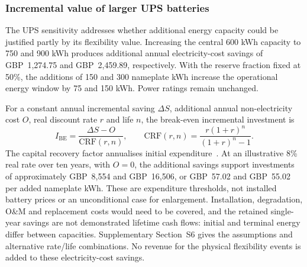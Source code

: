 \subsubsection{Incremental value of larger UPS batteries}
The UPS sensitivity addresses whether additional energy capacity could be justified partly by its flexibility value. Increasing the central 600 kWh capacity to 750 and 900 kWh produces additional annual electricity-cost savings of GBP~1,274.75 and GBP~2,459.89, respectively. With the reserve fraction fixed at 50\%, the additions of 150 and 300 nameplate kWh increase the operational energy window by 75 and 150 kWh. Power ratings remain unchanged.

For a constant annual incremental saving $\Delta S$, additional annual non-electricity cost $O$, real discount rate $r$ and life $n$, the break-even incremental investment is
\begin{equation}
I_{\mathrm{BE}}=\frac{\Delta S-O}{\mathrm{CRF}(r,n)},\qquad
\mathrm{CRF}(r,n)=\frac{r(1+r)^n}{(1+r)^n-1}.
\label{eq:ups-investment}
\end{equation}
The capital recovery factor annualises initial expenditure~\cite{sam_crf}. At an illustrative 8\% real rate over ten years, with $O=0$, the additional savings support investments of approximately GBP~8,554 and GBP~16,506, or GBP~57.02 and GBP~55.02 per added nameplate kWh. These are expenditure thresholds, not installed battery prices or an unconditional case for enlargement. Installation, degradation, O\&M and replacement costs would need to be covered, and the retained single-year savings are not demonstrated lifetime cash flows: initial and terminal energy differ between capacities. Supplementary Section~S6 gives the assumptions and alternative rate/life combinations. No revenue for the physical flexibility events is added to these electricity-cost savings.
